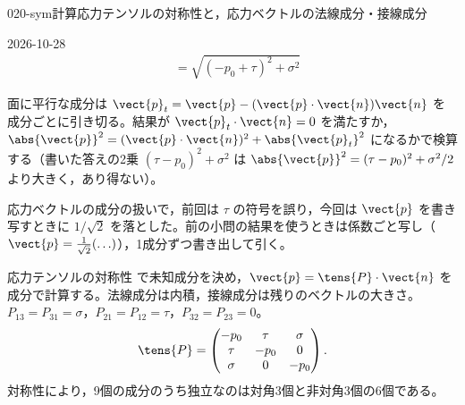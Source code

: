 \documentclass[uplatex,dvipdfmx,a4paper,11pt]{jsarticle}
\begin{document}
\begin{mondai}{020-sym}{計算}{応力テンソルの対称性と，応力ベクトルの法線成分・接線成分}
\begin{kotaeutsushi}{2026-10-28}
\begin{align*}
&=\sqrt{(-p_{0}+\tau)^{2}+\sigma^{2}}
\end{align*}
\end{kotaeutsushi}
\begin{kizuki}
\item 面に平行な成分は $\vect{p}_{t}=\vect{p}-(\vect{p}\cdot\vect{n})\vect{n}$ を成分ごとに引き切る。結果が $\vect{p}_{t}\cdot\vect{n}=0$ を満たすか，$\abs{\vect{p}}^{2}=(\vect{p}\cdot\vect{n})^{2}+\abs{\vect{p}_{t}}^{2}$ になるかで検算する（書いた答えの2乗 $(\tau-p_{0})^{2}+\sigma^{2}$ は $\abs{\vect{p}}^{2}=(\tau-p_{0})^{2}+\sigma^{2}/2$ より大きく，あり得ない）。
\item {} 応力ベクトルの成分の扱いで，前回は $\tau$ の符号を誤り，今回は $\vect{p}$ を書き写すときに $1/\sqrt{2}$ を落とした。前の小問の結果を使うときは係数ごと写し（$\vect{p}=\frac{1}{\sqrt{2}}(\ldots)$），1成分ずつ書き出して引く。
\end{kizuki}
\begin{tadashii}
\houshin 応力テンソルの対称性  で未知成分を決め，$\vect{p}=\tens{P}\cdot\vect{n}$ を成分で計算する。法線成分は内積，接線成分は残りのベクトルの大きさ。
\keisan {} $P_{13}=P_{31}=\sigma$，$P_{21}=P_{12}=\tau$，$P_{32}=P_{23}=0$。
\[ \tens{P}=\begin{pmatrix} -p_0 & \tau & \sigma\\ \tau & -p_0 & 0\\ \sigma & 0 & -p_0 \end{pmatrix}. \]
対称性により，9個の成分のうち独立なのは対角3個と非対角3個の6個である。


\end{tadashii}
\end{mondai}
\end{document}
